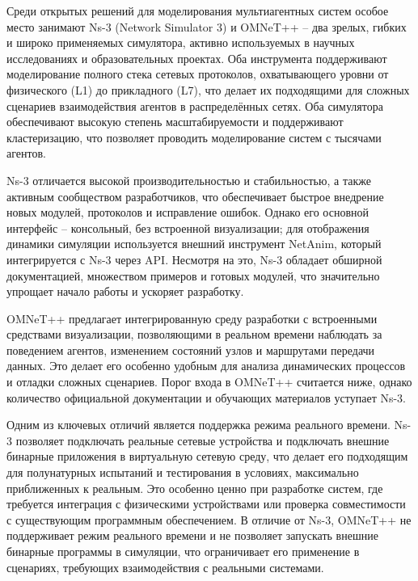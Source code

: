 \documentclass[
    numbers=section,
    document-code={ВКРБ--09.03.04--10.19--XX--26--81}
]{../latex/fqw}
\begin{document}
    Среди открытых решений для моделирования мультиагентных систем особое место занимают
    Ns-3 (Network Simulator 3)\nbspace\cite{thens-3consortiumNs3Manual}
    и
    OMNeT++\nbspace\cite{opensimltd.OMNeTUserManual}
    -- два зрелых, гибких и широко применяемых симулятора,
    активно используемых в научных исследованиях и образовательных проектах.
    Оба инструмента поддерживают моделирование полного стека сетевых протоколов,
    охватывающего уровни от физического (L1) до прикладного (L7),
    что делает их подходящими для сложных сценариев взаимодействия агентов в распределённых сетях.
    Оба симулятора обеспечивают высокую степень масштабируемости и поддерживают кластеризацию,
    что позволяет проводить моделирование систем с тысячами агентов.

    Ns-3 отличается высокой производительностью и стабильностью, а также активным сообществом разработчиков,
    что обеспечивает быстрое внедрение новых модулей, протоколов и исправление ошибок.
    Однако его основной интерфейс -- консольный, без встроенной визуализации;
    для отображения динамики симуляции используется внешний инструмент NetAnim,
    который интегрируется с Ns-3 через API.
    Несмотря на это, Ns-3 обладает обширной документацией, множеством примеров и готовых модулей,
    что значительно упрощает начало работы и ускоряет разработку.

    OMNeT++ предлагает интегрированную среду разработки с встроенными средствами визуализации,
    позволяющими в реальном времени наблюдать за поведением агентов,
    изменением состояний узлов и маршрутами передачи данных.
    Это делает его особенно удобным для анализа динамических процессов и отладки сложных сценариев.
    Порог входа в OMNeT++ считается ниже,
    однако количество официальной документации и обучающих материалов уступает Ns-3.

    Одним из ключевых отличий является поддержка режима реального времени.
    Ns-3 позволяет подключать реальные сетевые устройства и
    подключать внешние бинарные приложения в виртуальную сетевую среду,
    что делает его подходящим для полунатурных испытаний и тестирования в условиях, максимально приближенных к реальным.
    Это особенно ценно при разработке систем, где требуется интеграция с физическими устройствами или
    проверка совместимости с существующим программным обеспечением.
    В отличие от Ns-3, OMNeT++ не поддерживает режим реального времени и
    не позволяет запускать внешние бинарные программы в симуляции,
    что ограничивает его применение в сценариях, требующих взаимодействия с реальными системами.
\end{document}
